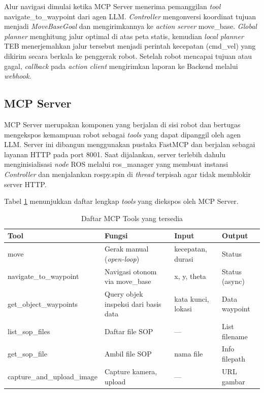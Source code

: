 Alur navigasi dimulai ketika MCP Server menerima pemanggilan \textit{tool} navigate\_to\_waypoint dari agen LLM. \textit{Controller} mengonversi koordinat tujuan menjadi \textit{MoveBaseGoal} dan mengirimkannya ke \textit{action server} move\_base. \textit{Global planner} menghitung jalur optimal di atas peta statis, kemudian \textit{local planner} TEB menerjemahkan jalur tersebut menjadi perintah kecepatan (cmd\_vel) yang dikirim secara berkala ke penggerak robot. Setelah robot mencapai tujuan atau gagal, \textit{callback} pada \textit{action client} mengirimkan laporan ke Backend melalui \textit{webhook}.

\subsection{MCP Server}

MCP Server merupakan komponen yang berjalan di sisi robot dan bertugas mengekspos kemampuan robot sebagai \textit{tools} yang dapat dipanggil oleh agen LLM. Server ini dibangun menggunakan pustaka FastMCP dan berjalan sebagai layanan HTTP pada port 8001. Saat dijalankan, server terlebih dahulu menginisialisasi \textit{node} ROS melalui ros\_manager yang membuat instansi \textit{Controller} dan menjalankan rospy.spin di \textit{thread} terpisah agar tidak memblokir server HTTP.

Tabel \ref{tab:mcp-tools} menunjukkan daftar lengkap \textit{tools} yang diekspos oleh MCP Server.

\begin{table}[H]
\centering
\caption{Daftar MCP Tools yang tersedia}
\label{tab:mcp-tools}
\begin{tabular}{|l|p{4cm}|p{3cm}|p{3cm}|}
\hline
\textbf{Tool} & \textbf{Fungsi} & \textbf{Input} & \textbf{Output} \\ \hline
move & Gerak manual (\textit{open-loop}) & kecepatan, durasi & Status \\ \hline
navigate\_to\_waypoint & Navigasi otonom via move\_base & x, y, theta & Status (async) \\ \hline
get\_object\_waypoints & Query objek inspeksi dari basis data & kata kunci, lokasi & Data waypoint \\ \hline
list\_sop\_files & Daftar file SOP & — & List filename \\ \hline
get\_sop\_file & Ambil file SOP & nama file & Info filepath \\ \hline
capture\_and\_upload\_image & Capture kamera, upload & — & URL gambar \\ \hline
\end{tabular}
\end{table}

